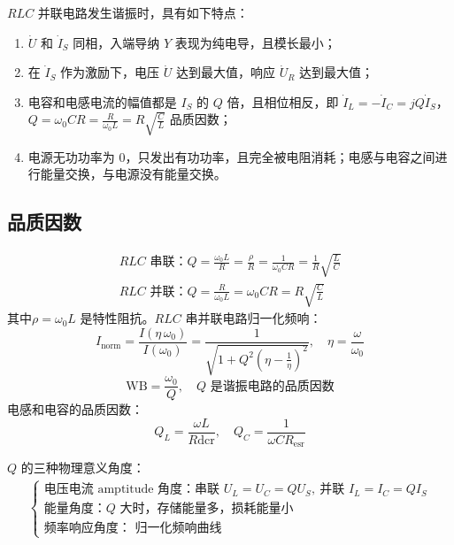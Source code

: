 \documentclass[a4paper]{article}  %
\theoremstyle{MyLineTheoremStyle} %
\theoremstyle{MyBlockTheoremStyle} %
\theoremstyle{MySubsubsectionStyle} %
\begin{document}
\begin{multicols*}{4}
\noindent $RLC$ 并联电路发生谐振时，具有如下特点：
\begin{enumerate}
\item $\dot{U}$ 和 $\dot{I}_S$ 同相，入端导纳 $Y$ 表现为纯电导，且模长最小；
\item 在 $\dot{I}_S$ 作为激励下，电压 $\dot{U}$ 达到最大值，响应 $\dot{U}_R$ 达到最大值；
\item 电容和电感电流的幅值都是 $I_S$ 的 $Q$ 倍，且相位相反，即 $\dot{I}_L = -\dot{I}_C = jQ \dot{I}_S$，$Q = \omega_0 C R = \frac{R}{\omega_0 L} = R\sqrt{\frac{C}{L}}$ 品质因数；
\item 电源无功功率为 0，只发出有功功率，且完全被电阻消耗；电感与电容之间进行能量交换，与电源没有能量交换。
\end{enumerate}

\subsection{品质因数}
\begin{gather}
RLC \text{\ 串联：} Q = \frac{\omega_0 L}{R} = \frac{\rho}{R} = \frac{1}{\omega_0 CR} = \frac{1}{R}\sqrt{\frac{L}{C}} \\ 
RLC \text{\ 并联：} Q = \frac{R}{\omega_0 L} = \omega_0 C R =  R\sqrt{\frac{C}{L}}
\end{gather}
其中$\rho = \omega_0 L$ 是特性阻抗。$RLC$ 串并联电路归一化频响：
\begin{equation}
I_\text{norm} = \frac{I(\eta \, \omega_0)}{I(\omega_0)} = \frac{1}{\sqrt{ 1 + Q^2 \left(\eta - \frac{1}{\eta}\right)^2 }},\quad \eta = \frac{\omega}{\omega_0}
\end{equation}
\begin{equation}
\text{WB} = \frac{\omega_0}{Q},\quad \text{$Q$ 是谐振电路的品质因数}
\end{equation}
电感和电容的品质因数：
\begin{equation}
Q_L = \frac{\omega L}{R\text{dcr}},\quad 
Q_C = \frac{1}{\omega C R_{\text{esr}}}
\end{equation}

$Q$ 的三种物理意义角度：
\begin{gather}
\begin{cases}
    \text{电压电流 amptitude 角度：} \text{串联\ } U_L = U_C = Q U_S,\
    \text{并联\ } I_L = I_C = Q I_S \\
    \text{能量角度：} \text{$Q$ 大时，存储能量多，损耗能量小} \\
    \text{频率响应角度： 归一化频响曲线} 
\end{cases}
\end{gather}


\end{multicols*}
\end{document}

